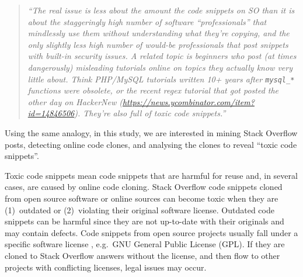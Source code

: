 \documentclass[10pt,journal,compsoc]{IEEEtran}
\begin{document}
\begin{quote}
	\textit{``The real issue is less about the amount the code snippets
	on SO than it is about the staggeringly high number of software
	``professionals'' that mindlessly use them without understanding what they're
	copying, and the only slightly less high number of would-be professionals that
	post snippets with built-in security issues.  A related topic is beginners who
	post (at times dangerously) misleading tutorials online on topics they actually
	know very little about. Think PHP/MySQL tutorials written 10+ years after
	\texttt{mysql\_*} functions were obsolete, or the recent regex tutorial that
	got posted the other day on HackerNew
	(\url{https://news.ycombinator.com/item?id=14846506}). They're also full of
	toxic code snippets.''}
\end{quote}

Using the same analogy, in this study, we are interested in mining Stack
Overflow posts, detecting online code clones, and analysing the clones to reveal
``toxic code snippets''.

Toxic code snippets mean code snippets that are harmful for reuse and, in
several cases, are caused by online code cloning. Stack Overflow code snippets
cloned from open source software or online sources can become toxic when they
are (1)~outdated or (2)~violating their original software
license. Outdated code snippets
can be harmful since they are not up-to-date with their originals and may
contain defects. Code snippets from open source projects usually fall under a
specific software license , e.g.\ GNU General Public License (GPL). If they are
cloned to Stack Overflow answers without the license, and then flow to other projects
with conflicting licenses, legal issues may occur.
\end{document}
